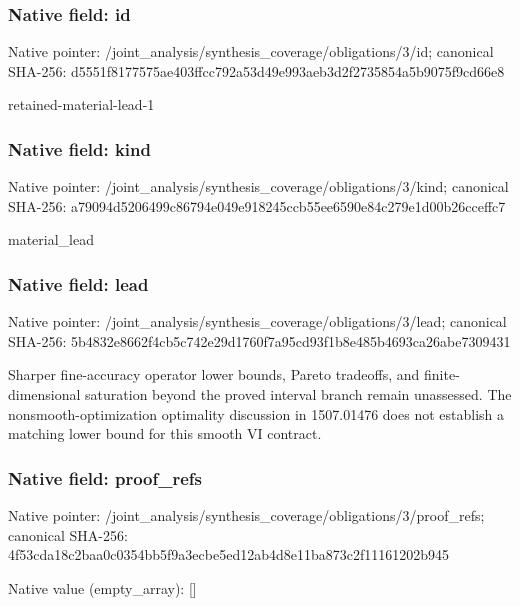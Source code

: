 \documentclass[10pt,a4paper]{article}
\begin{document}
\subsubsection{Native field: id}
Native pointer: /joint\_\allowbreak{}analysis/synthesis\_\allowbreak{}coverage/obligations/3/id; canonical SHA-256: d5551f8177575ae403ffcc792a53d49e993aeb3d2f2735854a5b9075f9cd66e8

\begingroup\raggedright\sloppy retained-material-lead-1\par\endgroup

\subsubsection{Native field: kind}
Native pointer: /joint\_\allowbreak{}analysis/synthesis\_\allowbreak{}coverage/obligations/3/kind; canonical SHA-256: a79094d5206499c86794e049e918245ccb55ee6590e84c279e1d00b26cceffc7

\begingroup\raggedright\sloppy material\_\allowbreak{}lead\par\endgroup

\subsubsection{Native field: lead}
Native pointer: /joint\_\allowbreak{}analysis/synthesis\_\allowbreak{}coverage/obligations/3/lead; canonical SHA-256: 5b4832e8662f4cb5c742e29d1760f7a95cd93f1b8e485b4693ca26abe7309431

\begingroup\raggedright\sloppy Sharper fine-accuracy operator lower bounds,\allowbreak{} Pareto tradeoffs,\allowbreak{} and finite-dimensional saturation beyond the proved interval branch remain unassessed. The nonsmooth-optimization optimality discussion in 1507.01476 does not establish a matching lower bound for this smooth VI contract.\par\endgroup

\subsubsection{Native field: proof\_\allowbreak{}refs}
Native pointer: /joint\_\allowbreak{}analysis/synthesis\_\allowbreak{}coverage/obligations/3/proof\_\allowbreak{}refs; canonical SHA-256: 4f53cda18c2baa0c0354bb5f9a3ecbe5ed12ab4d8e11ba873c2f11161202b945

Native value (empty\_\allowbreak{}array): []
\end{document}

